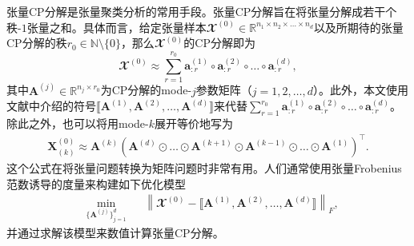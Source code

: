 张量CP分解是张量聚类分析的常用手段。张量CP分解旨在将张量分解成若干个秩-$1$张量之和。具体而言，给定张量样本$\mathbfcal{X}^{(0)}\in \mathbb{R}^{n_1 \times n_2 \times \ldots \times n_d}$以及所期待的张量CP分解的秩$r_{0}\in\mathbb{N}\setminus\{0\}$，那么$\mathbfcal{X}^{(0)}$的CP分解即为
\begin{equation}\label{eq:cp-approx}
	\mathbfcal{X}^{(0)}\approx\sum_{r=1}^{r_{0}}\boldsymbol{a}^{(1)}_{:r} \circ \boldsymbol{a}^{(2)}_{:r} \circ \ldots \circ \boldsymbol{a}^{(d)}_{:r},
\end{equation}
其中$\boldsymbol{A}^{(j)}\in\mathbb{R}^{n_{j}\times r_{0}}$为CP分解的mode-$j$参数矩阵（$j=1,2,\ldots,d$）。此外，本文使用文献中介绍的符号$\llbracket \boldsymbol{A}^{(1)}, \boldsymbol{A}^{(2)}, \ldots, \boldsymbol{A}^{(d)} \rrbracket$来代替$\sum_{r=1}^{r_{0}}\boldsymbol{a}^{(1)}_{:r} \circ \boldsymbol{a}^{(2)}_{:r} \circ \ldots \circ \boldsymbol{a}^{(d)}_{:r}$。除此之外，也可以将用mode-$k$展开等价地写为
\begin{equation*}
	\begin{aligned}
		\boldsymbol{X}^{(0)}_{(k)} \approx  \boldsymbol{A}^{(k)}\left(\boldsymbol{A}^{(d)} \odot \ldots \odot \boldsymbol{A}^{(k+1)} \odot \boldsymbol{A}^{(k-1)} \odot \ldots \odot \boldsymbol{A}^{(1)} \right)^{\top}.
		\end{aligned}
\end{equation*}
这个公式在将张量问题转换为矩阵问题时非常有用。人们通常使用张量Frobenius范数诱导的度量来构建如下优化模型
\begin{equation*}\label{cp}
	\begin{aligned}
		&\underset{\{\boldsymbol{A}^{(j)}\}_{j=1}^{d}}{\min}&& \left\|\mathbfcal{X}^{(0)}-\llbracket \boldsymbol{A}^{(1)}, \boldsymbol{A}^{(2)}, \ldots, \boldsymbol{A}^{(d)} \rrbracket\right\|_{F},
	\end{aligned}
\end{equation*}
并通过求解该模型来数值计算张量CP分解。
